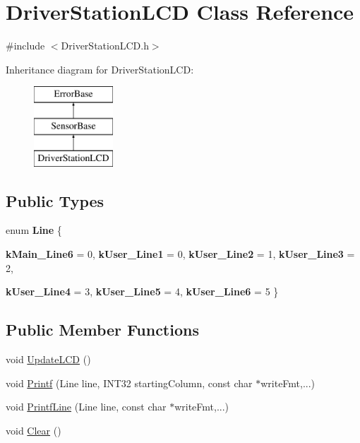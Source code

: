 \hypertarget{classDriverStationLCD}{
\section{DriverStationLCD Class Reference}
\label{classDriverStationLCD}
}


{\ttfamily \#include $<$DriverStationLCD.h$>$}

Inheritance diagram for DriverStationLCD:\begin{figure}[H]
\begin{center}
\leavevmode
\includegraphics[height=3.000000cm]{classDriverStationLCD}
\end{center}
\end{figure}
\subsection*{Public Types}
\begin{DoxyCompactItemize}
\item 
enum {\bfseries Line} \{ \par
{\bfseries kMain\_\-Line6} = 0, 
{\bfseries kUser\_\-Line1} = 0, 
{\bfseries kUser\_\-Line2} = 1, 
{\bfseries kUser\_\-Line3} = 2, 
\par
{\bfseries kUser\_\-Line4} = 3, 
{\bfseries kUser\_\-Line5} = 4, 
{\bfseries kUser\_\-Line6} = 5
 \}
\end{DoxyCompactItemize}
\subsection*{Public Member Functions}
\begin{DoxyCompactItemize}
\item 
void \hyperlink{classDriverStationLCD_ac80467f0853ddf9cc1a82a927a366bde}{UpdateLCD} ()
\item 
void \hyperlink{classDriverStationLCD_a57e0628e1335e70050a7de3e9419df42}{Printf} (Line line, INT32 startingColumn, const char $\ast$writeFmt,...)
\item 
void \hyperlink{classDriverStationLCD_a369fcb21952476eac121c5d76f4eb5b1}{PrintfLine} (Line line, const char $\ast$writeFmt,...)
\item 
void \hyperlink{classDriverStationLCD_a1d33a6a650592857f1ac605a87a5c0d5}{Clear} ()
\end{DoxyCompactItemize}
